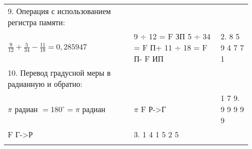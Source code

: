 \documentclass[12pt]{article} %
\begin{document}
\begin{tabular}{ p{5cm} p{4cm} p{4cm} }
    9. Операция с использованием регистра памяти: \\
    $\frac{9}{12} + \frac{5}{34} - \frac{11}{18} = 0,285947$ & 9 ÷ 12 = F ЗП  5 ÷ 34 = F П+  11 ÷ 18 = F П-  F ИП & 2. 8 5 9 4 7 7 1 \\
    \vspace{0.1cm}

    10. Перевод градусной меры в радианную и обратно: \\
    $\pi$ радиан $ = 180^{\circ} = \pi $ радиан & $\pi$ F  Р->Г & 1 7 9. 9 9 9 9 9 \\
    F  Г->Р  & 3. 1 4 1 5 2 5 \\
    \vspace{0.1cm}

\end{tabular}
\end{document}
